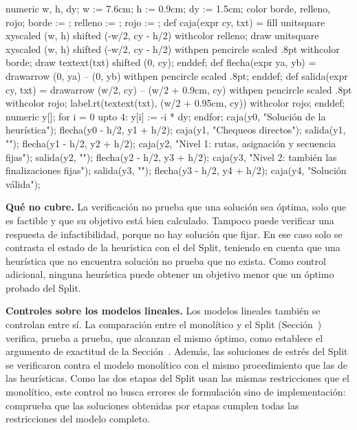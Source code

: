 {\startMPcode
numeric w, h, dy; w := 7.6cm; h := 0.9cm; dy := 1.5cm;
color borde, relleno, rojo;
borde := ; relleno := ; rojo := ;
def caja(expr cy, txt) =
  fill unitsquare xyscaled (w, h) shifted (-w/2, cy - h/2) withcolor relleno;
  draw unitsquare xyscaled (w, h) shifted (-w/2, cy - h/2) withpen pencircle scaled .8pt withcolor borde;
  draw textext(txt) shifted (0, cy);
enddef;
def flecha(expr ya, yb) =
  drawarrow (0, ya) -- (0, yb) withpen pencircle scaled .8pt;
enddef;
def salida(expr cy, txt) =
  drawarrow (w/2, cy) -- (w/2 + 0.9cm, cy) withpen pencircle scaled .8pt withcolor rojo;
  label.rt(textext(txt), (w/2 + 0.95cm, cy)) withcolor rojo;
enddef;
numeric y[];
for i = 0 upto 4: y[i] := -i * dy; endfor;
caja(y0, "Solución de la heurística");
flecha(y0 - h/2, y1 + h/2);
caja(y1, "Chequeos directos");
salida(y1, "");
flecha(y1 - h/2, y2 + h/2);
caja(y2, "Nivel 1: rutas, asignación y secuencia fijas");
salida(y2, "");
flecha(y2 - h/2, y3 + h/2);
caja(y3, "Nivel 2: también las finalizaciones fijas");
salida(y3, "");
flecha(y3 - h/2, y4 + h/2);
caja(y4, "Solución válida");
\stopMPcode}


{\bf Qué no cubre.} La verificación no prueba que una solución sea óptima,
solo que es factible y que su objetivo está bien calculado. Tampoco puede
verificar una respuesta de infactibilidad, porque no hay solución que fijar.
En ese caso solo se contrasta el estado de la heurística con el del Split,
teniendo en cuenta que una heurística que no encuentra solución no prueba
que no exista. Como control adicional, ninguna heurística puede obtener un
objetivo menor que un óptimo probado del Split.

{\bf Controles sobre los modelos lineales.} Los modelos lineales también se controlan entre sí. La comparación entre el
monolítico y el Split (Sección~) verifica, prueba a
prueba, que alcanzan el mismo óptimo, como establece el argumento de
exactitud de la Sección~. Además, las soluciones de
estrés del Split se verificaron contra el modelo monolítico con el mismo
procedimiento que las de las heurísticas. Como las dos etapas del Split usan
las mismas restricciones que el monolítico, este control no busca errores de
formulación sino de implementación: comprueba que las soluciones obtenidas
por etapas cumplen todas las restricciones del modelo completo.

